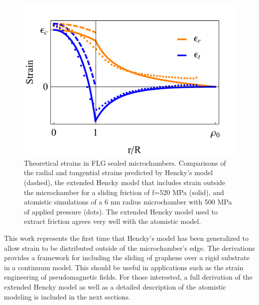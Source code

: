 \begin{figure}
	\begin{center}
	\includegraphics{Figs_Friction/Figure_3.pdf}
	\end{center}
	\caption[Continuum model of pressurized, graphene sealed, circular microchambers]{\label{fig:fri:theory} Theoretical strains in FLG sealed microchambers. Comparisons of the radial and tangential strains predicted by Hencky's model (dashed), the extended Hencky model that includes strain outside the microchamber for a sliding friction of f=520 MPa (solid), and atomistic simulations of a 6 nm radius microchamber with 500 MPa of applied pressure (dots). The extended Hencky model used to extract friction agrees very well with the atomistic model.}
\end{figure}

This work represents the first time that Hencky's model has been generalized to allow strain to be distributed outside of the microchamber's edge.
The derivations provides a framework for including the sliding of graphene over a rigid substrate in a continuum model.
This should be useful in applications such as the strain engineering of pseudomagnetic fields.
For those interested, a full derivation of the extended Hencky model as well as a detailed description of the atomistic modeling is included in the next sections.

